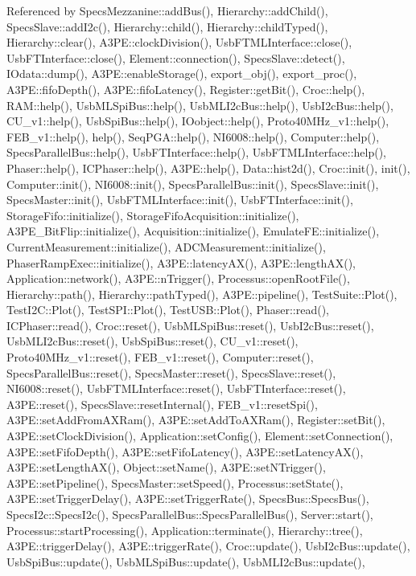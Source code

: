Referenced by Specs\+Mezzanine\+::add\+Bus(), Hierarchy\+::add\+Child(), Specs\+Slave\+::add\+I2c(), Hierarchy\+::child(), Hierarchy\+::child\+Typed(), Hierarchy\+::clear(), A3\+P\+E\+::clock\+Division(), Usb\+F\+T\+M\+L\+Interface\+::close(), Usb\+F\+T\+Interface\+::close(), Element\+::connection(), Specs\+Slave\+::detect(), I\+Odata\+::dump(), A3\+P\+E\+::enable\+Storage(), export\+\_\+obj(), export\+\_\+proc(), A3\+P\+E\+::fifo\+Depth(), A3\+P\+E\+::fifo\+Latency(), Register\+::get\+Bit(), Croc\+::help(), R\+A\+M\+::help(), Usb\+M\+L\+Spi\+Bus\+::help(), Usb\+M\+L\+I2c\+Bus\+::help(), Usb\+I2c\+Bus\+::help(), C\+U\+\_\+v1\+::help(), Usb\+Spi\+Bus\+::help(), I\+Oobject\+::help(), Proto40\+M\+Hz\+\_\+v1\+::help(), F\+E\+B\+\_\+v1\+::help(), help(), Seq\+P\+G\+A\+::help(), N\+I6008\+::help(), Computer\+::help(), Specs\+Parallel\+Bus\+::help(), Usb\+F\+T\+Interface\+::help(), Usb\+F\+T\+M\+L\+Interface\+::help(), Phaser\+::help(), I\+C\+Phaser\+::help(), A3\+P\+E\+::help(), Data\+::hist2d(), Croc\+::init(), init(), Computer\+::init(), N\+I6008\+::init(), Specs\+Parallel\+Bus\+::init(), Specs\+Slave\+::init(), Specs\+Master\+::init(), Usb\+F\+T\+M\+L\+Interface\+::init(), Usb\+F\+T\+Interface\+::init(), Storage\+Fifo\+::initialize(), Storage\+Fifo\+Acquisition\+::initialize(), A3\+P\+E\+\_\+\+Bit\+Flip\+::initialize(), Acquisition\+::initialize(), Emulate\+F\+E\+::initialize(), Current\+Measurement\+::initialize(), A\+D\+C\+Measurement\+::initialize(), Phaser\+Ramp\+Exec\+::initialize(), A3\+P\+E\+::latency\+A\+X(), A3\+P\+E\+::length\+A\+X(), Application\+::network(), A3\+P\+E\+::n\+Trigger(), Processus\+::open\+Root\+File(), Hierarchy\+::path(), Hierarchy\+::path\+Typed(), A3\+P\+E\+::pipeline(), Test\+Suite\+::\+Plot(), Test\+I2\+C\+::\+Plot(), Test\+S\+P\+I\+::\+Plot(), Test\+U\+S\+B\+::\+Plot(), Phaser\+::read(), I\+C\+Phaser\+::read(), Croc\+::reset(), Usb\+M\+L\+Spi\+Bus\+::reset(), Usb\+I2c\+Bus\+::reset(), Usb\+M\+L\+I2c\+Bus\+::reset(), Usb\+Spi\+Bus\+::reset(), C\+U\+\_\+v1\+::reset(), Proto40\+M\+Hz\+\_\+v1\+::reset(), F\+E\+B\+\_\+v1\+::reset(), Computer\+::reset(), Specs\+Parallel\+Bus\+::reset(), Specs\+Master\+::reset(), Specs\+Slave\+::reset(), N\+I6008\+::reset(), Usb\+F\+T\+M\+L\+Interface\+::reset(), Usb\+F\+T\+Interface\+::reset(), A3\+P\+E\+::reset(), Specs\+Slave\+::reset\+Internal(), F\+E\+B\+\_\+v1\+::reset\+Spi(), A3\+P\+E\+::set\+Add\+From\+A\+X\+Ram(), A3\+P\+E\+::set\+Add\+To\+A\+X\+Ram(), Register\+::set\+Bit(), A3\+P\+E\+::set\+Clock\+Division(), Application\+::set\+Config(), Element\+::set\+Connection(), A3\+P\+E\+::set\+Fifo\+Depth(), A3\+P\+E\+::set\+Fifo\+Latency(), A3\+P\+E\+::set\+Latency\+A\+X(), A3\+P\+E\+::set\+Length\+A\+X(), Object\+::set\+Name(), A3\+P\+E\+::set\+N\+Trigger(), A3\+P\+E\+::set\+Pipeline(), Specs\+Master\+::set\+Speed(), Processus\+::set\+State(), A3\+P\+E\+::set\+Trigger\+Delay(), A3\+P\+E\+::set\+Trigger\+Rate(), Specs\+Bus\+::\+Specs\+Bus(), Specs\+I2c\+::\+Specs\+I2c(), Specs\+Parallel\+Bus\+::\+Specs\+Parallel\+Bus(), Server\+::start(), Processus\+::start\+Processing(), Application\+::terminate(), Hierarchy\+::tree(), A3\+P\+E\+::trigger\+Delay(), A3\+P\+E\+::trigger\+Rate(), Croc\+::update(), Usb\+I2c\+Bus\+::update(), Usb\+Spi\+Bus\+::update(), Usb\+M\+L\+Spi\+Bus\+::update(), Usb\+M\+L\+I2c\+Bus\+::update(), 